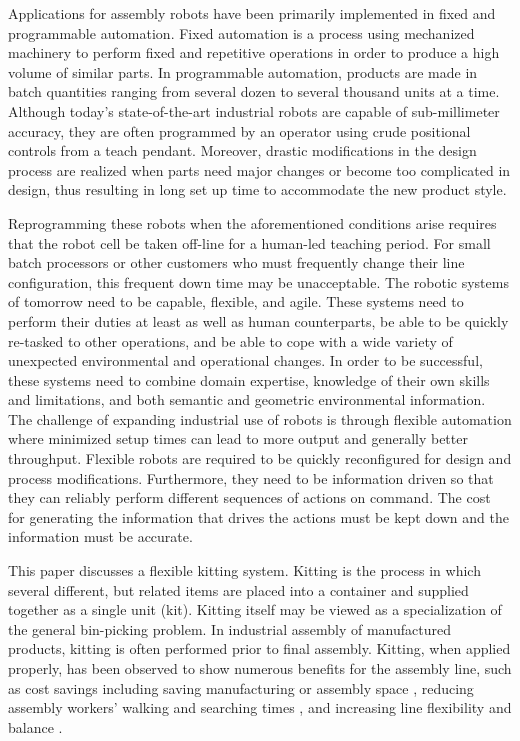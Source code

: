 Applications for assembly robots have been primarily implemented in fixed
and programmable automation. Fixed automation is a process using mechanized
machinery to perform fixed and repetitive operations in order to produce a
high volume of similar parts. In programmable automation, products are made
in batch quantities ranging from several dozen to several thousand units at
a time. Although today's state-of-the-art industrial robots are capable of
sub-millimeter accuracy, they are often programmed by
an operator using crude positional controls from a teach pendant. Moreover,
drastic modifications in the design process are realized when parts need
major changes or become too complicated in design, thus resulting in long
set up time to accommodate the new product style.

Reprogramming these robots when the aforementioned conditions arise
requires that the robot cell be taken off-line for a human-led teaching
period. For small batch processors or other customers who must frequently
change their line configuration, this frequent down time may be
unacceptable. The robotic systems of tomorrow need to be capable, flexible,
and agile. These systems need to perform their duties at least as well as
human counterparts, be able to be quickly re-tasked to other operations,
and be able to cope with a wide variety of unexpected environmental and
operational changes. In order to be successful, these systems need to
combine domain expertise, knowledge of their own skills and limitations,
and both semantic and geometric environmental information. The challenge of
expanding industrial use of robots is through flexible automation where
minimized setup times can lead to more output and generally better
throughput. Flexible robots are required to be quickly reconfigured for
design and process modifications. Furthermore, they need to be information
driven so that they can reliably perform different sequences of actions on
command. The cost for generating the information that drives the actions
must be kept down and the information must be accurate.

This paper discusses a flexible kitting system. Kitting is the process in
which several different, but related items are placed into a container and
supplied together as a single unit (kit). Kitting itself may be viewed as a
specialization of the general bin-picking problem. In industrial assembly
of manufactured products, kitting is often performed prior to final
assembly. Kitting, when applied properly, has been observed to show
numerous benefits for the assembly line, such as cost
savings \cite{Carlsson_2008} including saving manufacturing or assembly
space \cite{Medbo2003}, reducing assembly workers' walking and searching
times \cite{Schwind1992}, and increasing line flexibility \cite{Bozer1992}
and balance \cite{Jiao2000}.

